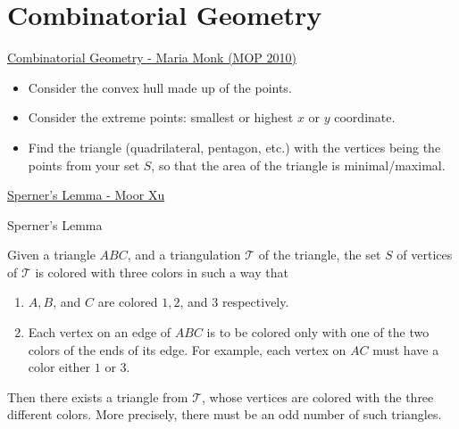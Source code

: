 \graphicspath{{Pics/combi/geo/}}

\newpage
\section{Combinatorial Geometry}


\begin{myitemize}
\item \href{https://blogm4e.files.wordpress.com/2016/08/combinatorial-geometry-maria-monks-mop-2010.pdf}{Combinatorial Geometry - Maria Monk (MOP 2010)}
\end{myitemize}


\begin{take_note*}{}
    \begin{itemize}[wide=0pt]
        \item Consider the convex hull made up of the points.
        \item Consider the extreme points: smallest or highest $ x $ or $ y $ coordinate.
        \item Find the triangle (quadrilateral, pentagon, etc.)  with the vertices being the points from your set $ S $, so that the area of the triangle is minimal/maximal.
    \end{itemize}
\end{take_note*}



\vspace{1em}

\begin{myitemize}
    \item \href{https://math.berkeley.edu/~moorxu/misc/equiareal.pdf}{Sperner's
        Lemma - Moor Xu}
\end{myitemize}

{Sperner's Lemma}{
    Given a triangle $ABC$, and a triangulation $\mathcal{T}$ of the triangle,
    the set $S$ of vertices of $\mathcal{T}$ is colored with three colors in
    such a way that
    \begin{enumerate}
        \item $A, B$, and $C$ are colored $1, 2$, and $3$ respectively.
        \item Each vertex on an edge of $ABC$ is to be colored only with one of the
            two colors of the ends of its edge. For example, each vertex on $AC$
            must have a color either $1$ or $3$.
    \end{enumerate}
    Then there exists a triangle from $\mathcal{T}$, whose vertices are colored with the
    three different colors. More precisely, there must be an odd number of
    such triangles. 
}



